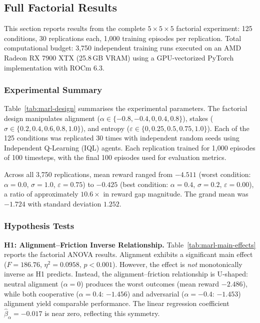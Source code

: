 \subsection{Full Factorial Results}
\label{sec:marl-full-results}

This section reports results from the complete $5 \times 5 \times 5$ factorial experiment: 125 conditions, 30 replications each, 1,000 training episodes per replication. Total computational budget: 3,750 independent training runs executed on an AMD Radeon RX 7900 XTX (25.8\,GB VRAM) using a GPU-vectorized PyTorch implementation with ROCm 6.3.

\subsubsection{Experimental Summary}

Table~\ref{tab:marl-design} summarises the experimental parameters. The factorial design manipulates alignment ($\alpha \in \{-0.8, -0.4, 0, 0.4, 0.8\}$), stakes ($\sigma \in \{0.2, 0.4, 0.6, 0.8, 1.0\}$), and entropy ($\varepsilon \in \{0, 0.25, 0.5, 0.75, 1.0\}$). Each of the 125 conditions was replicated 30 times with independent random seeds using Independent Q-Learning (IQL) agents. Each replication trained for 1,000 episodes of 100 timesteps, with the final 100 episodes used for evaluation metrics.

Across all 3,750 replications, mean reward ranged from $-4.511$ (worst condition: $\alpha = 0.0$, $\sigma = 1.0$, $\varepsilon = 0.75$) to $-0.425$ (best condition: $\alpha = 0.4$, $\sigma = 0.2$, $\varepsilon = 0.00$), a ratio of approximately $10.6\times$ in reward gap magnitude. The grand mean was $-1.724$ with standard deviation $1.252$.

\subsubsection{Hypothesis Tests}

\textbf{H1: Alignment--Friction Inverse Relationship.} Table~\ref{tab:marl-main-effects} reports the factorial ANOVA results. Alignment exhibits a significant main effect ($F = 186.76$, $\eta^2 = 0.0958$, $p < 0.001$). However, the effect is \emph{not} monotonically inverse as H1 predicts. Instead, the alignment--friction relationship is U-shaped: neutral alignment ($\alpha = 0$) produces the worst outcomes (mean reward $-2.486$), while both cooperative ($\alpha = 0.4$: $-1.456$) and adversarial ($\alpha = -0.4$: $-1.453$) alignment yield comparable performance. The linear regression coefficient $\hat{\beta}_\alpha = -0.017$ is near zero, reflecting this symmetry.

